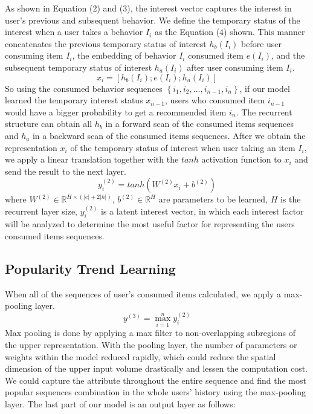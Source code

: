 \documentclass[runningheads]{llncs}
\begin{document}
As shown in Equation (2) and (3), the interest vector captures the interest in user's previous and subsequent behavior. We define the temporary status of the interest when a user takes a behavior $I_{i}$ as the Equation (4) shown. This manner concatenates the previous temporary status of interest $h_{b}(I_{i})$ before user consuming item $I_{i}$, the embedding of behavior $I_{i}$ consumed item $e(I_{i})$, and the subsequent temporary status of interest $h_{a}(I_{i})$ after user consuming item $I_{i}$.
\begin{equation}
x_{i}=[h_{b}(I_{i});e(I_{i});h_{a}(I_{i})]
\end{equation}
So using the consumed behavior sequences $\left \{ i_{1},i_{2},...,i_{n-1},i_{n} \right \}$, if our model learned the temporary interest status $x_{n-1}$, users who consumed item $i_{n-1}$ would have a bigger probability to get a recommended item $i_{n}$. The recurrent structure can obtain all $h_{b}$ in a forward scan of the consumed items sequences and $h_{a}$ in a backward scan of the consumed items sequences. After we obtain the representation $x_{i}$ of the temporary status of interest when user taking an item $I_{i}$, we apply a linear translation together with the $tanh$ activation function to $x_{i}$ and send the result to the next layer.
\begin{equation}
y_{i}^{(2)}=tanh(W^{(2)}x_{i}+b^{(2)})
\end{equation}
where $W^{(2)}\in \mathbb{R}^{H\times (|e|+2|h|)}$, $b^{(2)}\in \mathbb{R}^{H}$ are parameters to be learned, $H$ is the recurrent layer size, $y_{i}^{(2)}$ is a latent interest vector, in which each interest factor will be analyzed to determine the most useful factor for representing the users consumed items sequences.

\subsection{Popularity Trend Learning}
When all of the sequences of user's consumed items calculated, we apply a max-pooling layer.
\begin{equation}
y^{(3)}=\max_{i=1}^{n}y_{i}^{(2)}
\end{equation}
Max pooling is done by applying a max filter to non-overlapping subregions of the upper representation. With the pooling layer, the number of parameters or weights within the model reduced rapidly, which could reduce the spatial dimension of the upper input volume drastically and lessen the computation cost. We could capture the attribute throughout the entire sequence and find the most popular sequences combination in the whole users' history using the max-pooling layer. The last part of our model is an output layer as follows:
\end{document}
